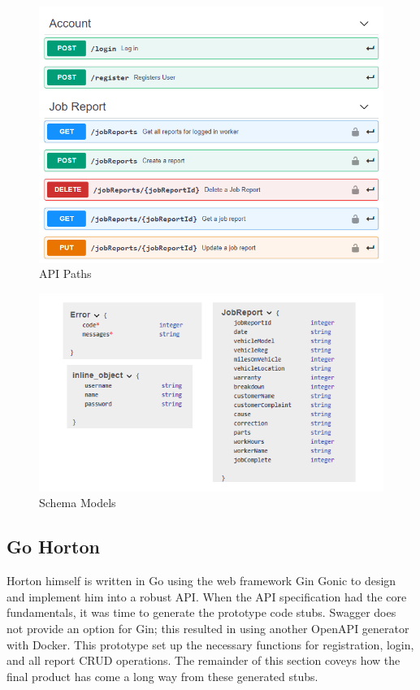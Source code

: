 \begin{figure}[!ht]
    \caption{API Paths}
    \label{image:paths}
    \centering
    \includegraphics[width=1.0\textwidth]{images/open_api/paths.png}
\end{figure}

\begin{figure}[H]
    \caption{Schema Models}
    \label{image:models}
    \centering
    \includegraphics[width=1.0\textwidth]{images/open_api/shema_models2.png}
\end{figure}

\subsection{Go Horton}
Horton himself is written in Go using the web framework Gin Gonic to design and implement him into a robust API. When the API specification had the core fundamentals, it was time to generate the prototype code stubs. Swagger does not provide an option for Gin; this resulted in using another OpenAPI generator with Docker. This prototype set up the necessary functions for registration, login, and all report CRUD operations. The remainder of this section coveys how the final product has come a long way from these generated stubs.

